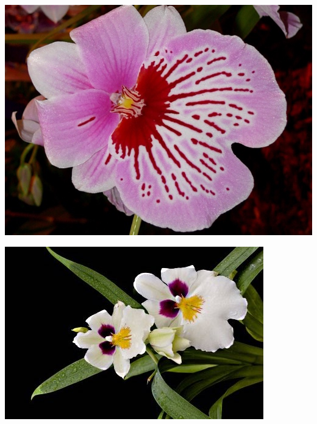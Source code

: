 \documentclass{article}
\begin{document}
\begin{center}
\includegraphics[height=0.925\paperheight]{../Orchid_Miltonia2.jpg}
\end{center}
\newpage

\begin{center}
\includegraphics[height=0.925\paperheight]{../Orchid_Miltonia3.jpg}
\end{center}
\newpage
\end{document}
